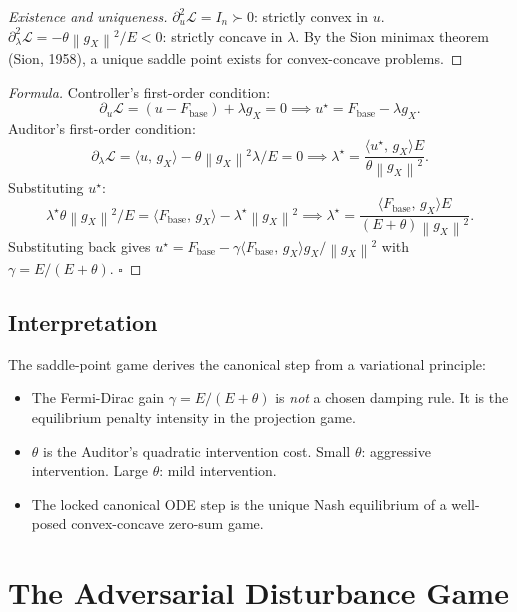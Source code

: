 \documentclass[11pt,a4paper]{article}
\theoremstyle{definition}
\newcommand{\norm}[1]{\left\|#1\right\|}
\newcommand{\inner}[2]{\langle #1,\,#2\rangle}
\newcommand{\Fbase}{F_{\mathrm{base}}}
\newcommand{\gX}{g_X}
\begin{document}
\begin{proof}[Existence and uniqueness]
$\partial^2_u\mathcal{L} = I_n \succ 0$: strictly convex in $u$.
$\partial^2_\lambda\mathcal{L} = -\theta\norm{\gX}^2/E < 0$: strictly concave in $\lambda$.
By the Sion minimax theorem (Sion, 1958), a unique saddle point exists for convex-concave problems.
\end{proof}

\begin{proof}[Formula]
Controller's first-order condition:
\[
\partial_u\mathcal{L} = (u-\Fbase) + \lambda\gX = 0 \implies u^\star = \Fbase - \lambda\gX.
\]
Auditor's first-order condition:
\[
\partial_\lambda\mathcal{L} = \inner{u}{\gX} - \theta\norm{\gX}^2\lambda/E = 0 \implies \lambda^\star = \frac{\inner{u^\star}{\gX}E}{\theta\norm{\gX}^2}.
\]
Substituting $u^\star$:
\[
\lambda^\star\theta\norm{\gX}^2/E = \inner{\Fbase}{\gX} - \lambda^\star\norm{\gX}^2
\implies
\lambda^\star = \frac{\inner{\Fbase}{\gX}E}{(E+\theta)\norm{\gX}^2}.
\]
Substituting back gives $u^\star = \Fbase - \gamma\inner{\Fbase}{\gX}\gX/\norm{\gX}^2$ with $\gamma = E/(E+\theta)$.
$\square$
\end{proof}

\subsection{Interpretation}

The saddle-point game derives the canonical step from a variational principle:

\begin{itemize}
\item The Fermi-Dirac gain $\gamma = E/(E+\theta)$ is \emph{not} a chosen damping rule. It is the equilibrium penalty intensity in the projection game.
\item $\theta$ is the Auditor's quadratic intervention cost. Small $\theta$: aggressive intervention. Large $\theta$: mild intervention.
\item The locked canonical ODE step is the unique Nash equilibrium of a well-posed convex-concave zero-sum game.
\end{itemize}

\section{The Adversarial Disturbance Game}
\end{document}
